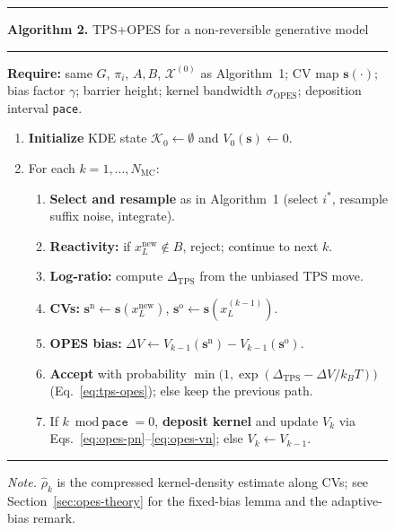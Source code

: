 \begin{figure}[t]
\hrule\vspace{2pt}
{\footnotesize\textbf{Algorithm 2.} TPS+OPES for a non-reversible generative model}
\vspace{1pt}\hrule\vspace{3pt}
{\footnotesize
\textbf{Require:} same $G$, $\pi_i$, $A,B$, $\mathcal{X}^{(0)}$ as Algorithm~1; CV map $\mathbf{s}(\cdot)$; bias factor $\gamma$; barrier height; kernel bandwidth $\sigma_{\mathrm{OPES}}$; deposition interval \texttt{pace}.
\begin{enumerate}\setlength{\itemsep}{0.15em}
  \item \textbf{Initialize} KDE state $\mathcal{K}_0\leftarrow\emptyset$ and $V_0(\mathbf{s})\leftarrow 0$.
  \item For each $k = 1,\ldots,N_{\mathrm{MC}}$:
  \begin{enumerate}\setlength{\itemsep}{0.1em}
    \item \textbf{Select and resample} as in Algorithm~1 (select $i^*$, resample suffix noise, integrate).
    \item \textbf{Reactivity:} if $x_L^{\mathrm{new}}\notin B$, reject; continue to next $k$.
    \item \textbf{Log-ratio:} compute $\Delta_{\mathrm{TPS}}$ from the unbiased TPS move.
    \item \textbf{CVs:} $\mathbf{s}^{\mathrm{n}} \leftarrow \mathbf{s}(x_L^{\mathrm{new}})$, $\mathbf{s}^{\mathrm{o}} \leftarrow \mathbf{s}(x_L^{(k-1)})$.
    \item \textbf{OPES bias:} $\Delta V \leftarrow V_{k-1}(\mathbf{s}^{\mathrm{n}}) - V_{k-1}(\mathbf{s}^{\mathrm{o}})$.
    \item \textbf{Accept} with probability $\min\bigl(1, \exp(\Delta_{\mathrm{TPS}} - \Delta V / k_BT)\bigr)$ (Eq.~\eqref{eq:tps-opes}); else keep the previous path.
    \item If $k \bmod \texttt{pace} = 0$, \textbf{deposit kernel} and update $V_k$ via Eqs.~\eqref{eq:opes-pn}--\eqref{eq:opes-vn}; else $V_k\leftarrow V_{k-1}$.
  \end{enumerate}
\end{enumerate}}
\vspace{1pt}\hrule\vspace{2pt}
{\footnotesize\textit{Note.} $\hat{\rho}_k$ is the compressed kernel-density estimate along CVs; see Section~\ref{sec:opes-theory} for the fixed-bias lemma and the adaptive-bias remark.}
\label{alg:tps-opes}
\end{figure}

